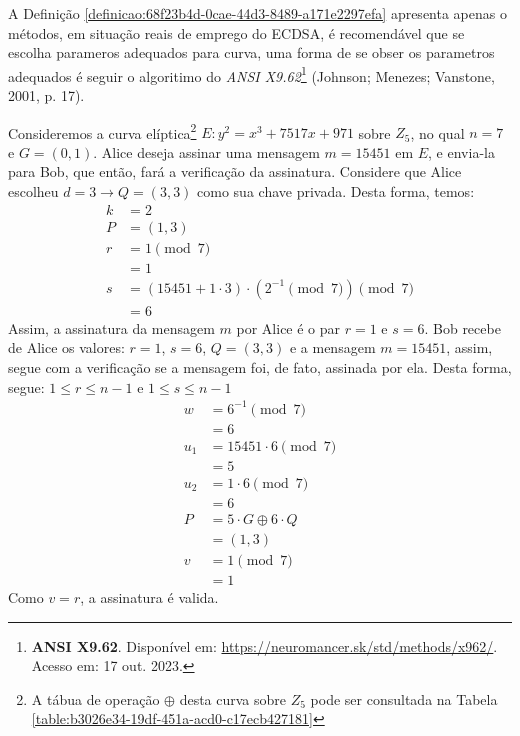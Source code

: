 \begin{observacao}
	A Definição \ref{definicao:68f23b4d-0cae-44d3-8489-a171e2297efa} apresenta apenas o métodos, em situação
	reais de emprego do ECDSA, é recomendável que se escolha parameros adequados para curva, uma forma de se obser
	os parametros adequados é seguir o algoritimo do \textit{ANSI X9.62}\footnote{\textbf{ANSI X9.62}. Disponível em:
		\url{https://neuromancer.sk/std/methods/x962/}. Acesso em: 17 out. 2023.}  (Johnson; Menezes; Vanstone, 2001, p. 17).
\end{observacao}

\begin{exemplo} \label{exemplo:bd38e680-313c-4e9f-84c2-d93cd29e7527}
	Consideremos a curva elíptica\footnote{A tábua de operação $\oplus$ desta curva
		sobre $Z_{5}$ pode ser consultada na Tabela
		\ref{table:b3026e34-19df-451a-acd0-c17ecb427181}} $E: y^2 = x^3 + 7517x + 971$
	sobre $Z_{5}$, no qual $n = 7$ e $G = (0, 1)$. Alice deseja assinar
	uma mensagem $m = 15451$ em $E$, e envia-la para Bob, que então, fará a
	verificação da assinatura. Considere que Alice escolheu $d = 3 \rightarrow Q =
		(3, 3)$ como sua chave privada. Desta forma, temos:
	\begin{align}
		k & = 2 \nonumber                                                    \\
		P & = (1, 3) \nonumber                                               \\
		r & = 1 \pmod{7} \nonumber                                           \\
		  & = 1 \nonumber                                                    \\
		s & = (15451 + 1 \cdot 3) \cdot (2^{-1} \pmod{7}) \pmod{7} \nonumber \\
		  & = 6 \nonumber
	\end{align}
	\justify
	Assim, a assinatura da mensagem $m$ por Alice é o par $r = 1$ e $s = 6$. Bob recebe de Alice os valores: $r = 1$, $s = 6$, $Q = (3, 3)$ e a mensagem $m = 15451$, assim, segue com
	a verificação se a mensagem foi, de fato, assinada por ela. Desta forma, segue:
	$1 \leq r \leq n - 1  \text{ e } 1 \leq s \leq n - 1 $
	\begin{align}
		w   & = 6^{-1} \pmod{7} \nonumber            \\
		    & = 6 \nonumber                          \\
		u_1 & = 15451 \cdot 6 \pmod{7} \nonumber     \\
		    & = 5 \nonumber                          \\
		u_2 & = 1 \cdot 6 \pmod{7} \nonumber         \\
		    & = 6 \nonumber                          \\
		P   & = 5 \cdot G \oplus 6 \cdot Q \nonumber \\
		    & = (1, 3) \nonumber                     \\
		v   & = 1 \pmod{7} \nonumber                 \\
		    & = 1 \nonumber
	\end{align}
	\justify
	Como $v = r$, a assinatura é valida.
	\vspace*{-0.4cm}
\end{exemplo}

